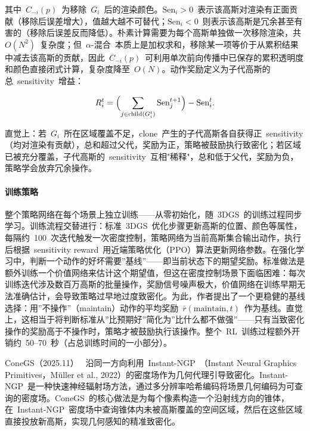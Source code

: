 其中~$C_{-i}(p)$~为移除~$G_i$~后的渲染颜色。$\text{Sen}_i > 0$~表示该高斯对渲染有正面贡献（移除后误差增大），值越大越不可替代；$\text{Sen}_i < 0$~则表示该高斯是冗余甚至有害的（移除后误差反而降低）。朴素计算需要为每个高斯单独做一次移除渲染，共~$O(N^2)$~复杂度；但~$\alpha$-混合~本质上是加权求和，移除某一项等价于从累积结果中减去该高斯的贡献，因此~$C_{-i}(p)$~可利用单次前向传播中已保存的累积透明度和颜色直接闭式计算，复杂度降至~$O(N)$。动作奖励定义为子代高斯的总~sensitivity~增益：

\begin{equation}
  R_i^t = \Bigl(\sum_{j \in \text{child}(G_i^t)} \text{Sen}_j^{t+1}\Bigr) - \text{Sen}_i^t.
\end{equation}

直觉上：若~$G_i$~所在区域覆盖不足，clone~产生的子代高斯各自获得正~sensitivity（均对渲染有贡献），总和超过父代，奖励为正，策略被鼓励执行致密化；若区域已被充分覆盖，子代高斯的~sensitivity~互相"稀释"，总和低于父代，奖励为负，策略学会放弃冗余操作。

\paragraph{训练策略} 整个策略网络在每个场景上独立训练——从零初始化，随~3DGS~的训练过程同步学习。训练流程交替进行：标准~3DGS~优化步骤更新高斯的位置、颜色等属性，每隔约~100~次迭代触发一次密度控制，策略网络为当前高斯集合输出动作，执行后根据~sensitivity reward~用近端策略优化（PPO）算法更新网络参数。在强化学习中，判断一个动作的好坏需要”基线”——即当前状态下的期望奖励。标准做法是额外训练一个价值网络来估计这个期望值，但这在密度控制场景下面临困难：每次训练迭代涉及数百万高斯的批量操作，奖励信号噪声极大，价值网络在训练早期无法准确估计，会导致策略过早地过度致密化。为此，作者提出了一个更稳健的基线选择：用”不操作”（maintain）动作的平均奖励~$\bar{r}(\text{maintain}, t)$~作为基线。直觉上，这相当于将判断标准从”比预期好”简化为”比什么都不做强”——只有当致密化操作的奖励高于不操作时，策略才被鼓励执行该操作。整个~RL~训练过程额外开销约~50–70~秒（占总训练时间的一小部分）。

ConeGS（2025.11）~\cite{2511_06810} 沿同一方向利用~Instant-NGP~（Instant Neural Graphics Primitives，Müller et al., 2022）的密度场作为几何代理引导致密化。Instant-NGP~是一种快速神经辐射场方法，通过多分辨率哈希编码将场景几何编码为可查询的密度场。ConeGS~的核心做法是为每个像素构造一个沿射线方向的锥体，在~Instant-NGP~密度场中查询锥体内未被高斯覆盖的空间区域，然后在这些区域直接投放新高斯，实现几何感知的精准致密化。

